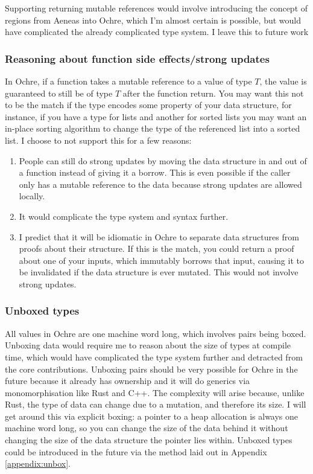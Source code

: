 \documentclass[12pt,twoside]{report}
\begin{document}
Supporting returning mutable references would involve introducing the concept of regions from Aeneas into Ochre, which I'm almost certain is possible, but would have complicated the already complicated type system. I leave this to future work 

\subsubsection{Reasoning about function side effects/strong updates}
In Ochre, if a function takes a mutable reference to a value of type $T$, the value is guaranteed to still be of type $T$ after the function return. You may want this not to be the match if the type encodes some property of your data structure, for instance, if you have a type for lists and another for sorted lists you may want an in-place sorting algorithm to change the type of the referenced list into a sorted list. I choose to not support this for a few reasons:
\begin{enumerate}
  \item People can still do strong updates by moving the data structure in and out of a function instead of giving it a borrow. This is even possible if the caller only has a mutable reference to the data because strong updates are allowed locally.
  \item It would complicate the type system and syntax further.
  \item I predict that it will be idiomatic in Ochre to separate data structures from proofs about their structure. If this is the match, you could return a proof about one of your inputs, which immutably borrows that input, causing it to be invalidated if the data structure is ever mutated. This would not involve strong updates.
\end{enumerate}

\subsubsection{Unboxed types}
All values in Ochre are one machine word long, which involves pairs being boxed. Unboxing data would require me to reason about the size of types at compile time, which would have complicated the type system further and detracted from the core contributions. Unboxing pairs should be very possible for Ochre in the future because it already has ownership and it will do generics via monomorphisation like Rust and C++. The complexity will arise because, unlike Rust, the type of data can change due to a mutation, and therefore its size. I will get around this via explicit boxing: a pointer to a heap allocation is always one machine word long, so you can change the size of the data behind it without changing the size of the data structure the pointer lies within. Unboxed types could be introduced in the future via the method laid out in Appendix \ref{appendix:unbox}.
\end{document}
